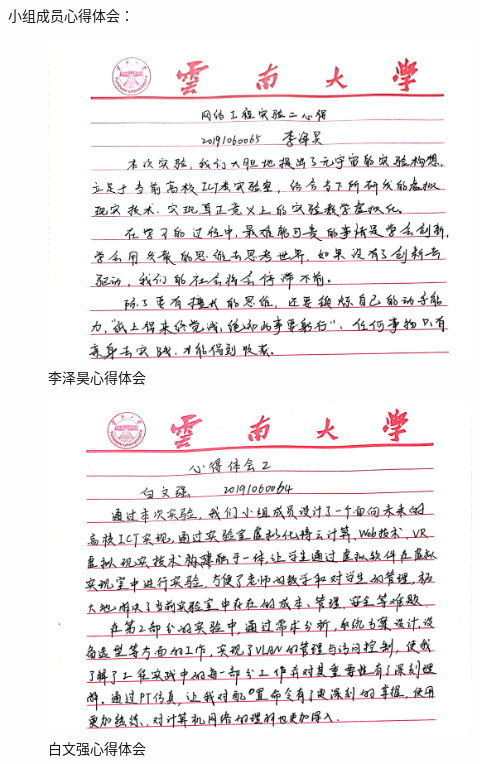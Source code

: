 \documentclass{imutthesis}
\begin{document}
小组成员心得体会：
\begin{figure}[h]
    \centering
        \centering
        \includegraphics[width=15cm]{lzh.jpg}
        \caption{李泽昊心得体会}
\end{figure}
\begin{figure}[h]
    \centering
        \centering
        \includegraphics[width=15cm]{bwq.jpg}
        \caption{白文强心得体会}
\end{figure}
\end{document}
